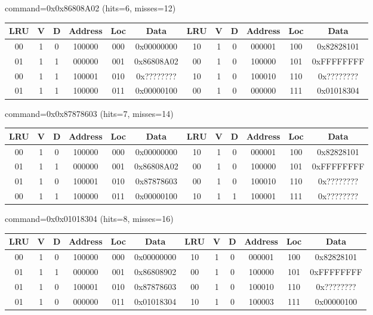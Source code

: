 \begin{enumerate}
{    command=0x0x86808A02 (hits=6, misses=12)

    \begin{tabular}{|c|c|c|c|c|c||c|c|c|c|c|c|} \hline
    LRU   & V & D & Address & Loc & Data       & LRU   & V & D & Address & Loc & Data        \\ \hline
    00    & 1 & 0 & 100000  & 000 & 0x00000000 & 10    & 1 & 0 & 000001  & 100 & 0x82828101  \\ \hline
    01    & 1 & 1 & 000000  & 001 & 0x86808A02 & 00    & 1 & 0 & 100000  & 101 & 0xFFFFFFFF  \\ \hline
    00    & 1 & 1 & 100001  & 010 & 0x???????? & 10    & 1 & 0 & 100010  & 110 & 0x????????  \\ \hline
    01    & 1 & 1 & 100000  & 011 & 0x00000100 & 00    & 1 & 0 & 000000  & 111 & 0x01018304  \\ \hline
    \end{tabular}


    command=0x0x87878603 (hits=7, misses=14)

    \begin{tabular}{|c|c|c|c|c|c||c|c|c|c|c|c|} \hline
    LRU   & V & D & Address & Loc & Data       & LRU   & V & D & Address & Loc & Data        \\ \hline
    00    & 1 & 0 & 100000  & 000 & 0x00000000 & 10    & 1 & 0 & 000001  & 100 & 0x82828101  \\ \hline
    01    & 1 & 1 & 000000  & 001 & 0x86808A02 & 00    & 1 & 0 & 100000  & 101 & 0xFFFFFFFF  \\ \hline
    01    & 1 & 0 & 100001  & 010 & 0x87878603 & 00    & 1 & 0 & 100010  & 110 & 0x????????  \\ \hline
    00    & 1 & 1 & 100000  & 011 & 0x00000100 & 10    & 1 & 1 & 100001  & 111 & 0x????????  \\ \hline
    \end{tabular}


    command=0x0x01018304 (hits=8, misses=16)

    \begin{tabular}{|c|c|c|c|c|c||c|c|c|c|c|c|} \hline
    LRU   & V & D & Address & Loc & Data       & LRU   & V & D & Address & Loc & Data        \\ \hline
    00    & 1 & 0 & 100000  & 000 & 0x00000000 & 10    & 1 & 0 & 000001  & 100 & 0x82828101  \\ \hline
    01    & 1 & 1 & 000000  & 001 & 0x86808902 & 00    & 1 & 0 & 100000  & 101 & 0xFFFFFFFF  \\ \hline
    01    & 1 & 0 & 100001  & 010 & 0x87878603 & 00    & 1 & 0 & 100010  & 110 & 0x????????  \\ \hline
    01    & 1 & 0 & 000000  & 011 & 0x01018304 & 10    & 1 & 0 & 100003  & 111 & 0x00000100  \\ \hline
    \end{tabular}


}
\end{enumerate}
